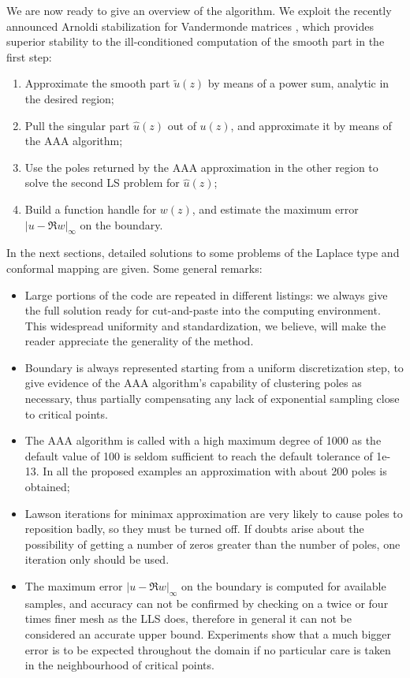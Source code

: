 \documentclass[final,a4paper,onecolumn,3p]{elsarticle}
\begin{document}
We are now ready to give an overview of the algorithm. We exploit the recently announced Arnoldi stabilization for Vandermonde matrices \cite{Tr19b}, which provides superior stability to the ill-conditioned computation of the smooth part in the first step:
\begin{enumerate}
	\item Approximate the smooth part $\tilde{u}(z)$ by means of a power sum, analytic in the desired region;
	\item Pull the singular part $\hat{u}(z)$ out of $u(z)$, and approximate it by means of the AAA algorithm;
	\item Use the poles returned by the AAA approximation in the other region to solve the second LS problem for $\hat{u}(z)$;
	\item Build a function handle for $w(z)$, and estimate the maximum error $|u-\Re w|_\infty$ on the boundary.
\end{enumerate}
In the next sections, detailed solutions to some problems of the Laplace type and conformal mapping are given. Some general remarks:
\renewcommand{\labelitemi}{$\square$}
\begin{itemize}
	\item Large portions of the code are repeated in different listings: we always give the full solution ready for cut-and-paste into the computing environment. This widespread uniformity and standardization, we believe, will make the reader appreciate the generality of the method.
	\item Boundary is always represented starting from a uniform discretization step, to give evidence of the AAA algorithm's capability of clustering poles as necessary, thus partially compensating any lack of exponential sampling close to critical points.
	\item The AAA algorithm is called with a high maximum degree of 1000 as the default value of 100 is seldom sufficient to reach the default tolerance of 1e-13. In all the proposed examples an approximation with about 200 poles is obtained;
	\item Lawson iterations for minimax approximation are very likely to cause poles to reposition badly, so they must be turned off. If doubts arise about the possibility of getting a number of zeros greater than the number of poles, one iteration only should be used.
	\item The maximum error $|u-\Re w|_\infty$ on the boundary is computed for available samples, and accuracy can not be confirmed by checking on a twice or four times finer mesh as the LLS does, therefore in general it can not be considered an accurate upper bound. Experiments show that a much bigger error is to be expected throughout the domain if no particular care is taken in the neighbourhood of critical points.
\end{itemize}
\end{document}
